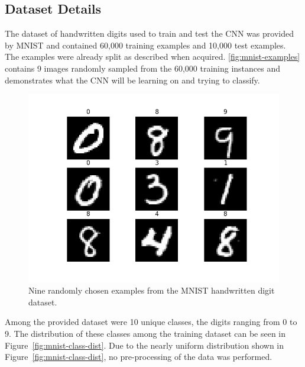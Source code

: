 \documentclass[a4paper]{article}
\begin{document}
\subsection{Dataset Details}
The dataset of handwritten digits used to train and test the CNN was provided by MNIST and contained 60,000 training examples and 10,000 test examples. The examples were already split as described when acquired. \autoref{fig:mnist-examples} contains 9 images randomly sampled from the 60,000 training instances and demonstrates what the CNN will be learning on and trying to classify.

\begin{figure}[h]
    \centering
    \includegraphics[scale=0.5]{images/mnist-examples.png}
    \caption{Nine randomly chosen examples from the MNIST handwritten digit dataset.}
    \label{fig:mnist-examples}
\end{figure}

Among the provided dataset were 10 unique classes, the digits ranging from 0 to 9. The distribution of these classes among the training dataset can be seen in Figure~\ref{fig:mnist-class-dist}. Due to the nearly uniform distribution shown in Figure~\ref{fig:mnist-class-dist}, no pre-processing of the data was performed.
\end{document}
